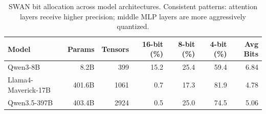 \begin{table}[t]
\centering
\caption{SWAN bit allocation across model architectures. Consistent patterns: attention layers receive higher precision; middle MLP layers are more aggressively quantized.}
\label{tab:scaling}
\begin{tabular}{lrrrrrr}
\toprule
Model & Params & Tensors & 16-bit (\%) & 8-bit (\%) & 4-bit (\%) & Avg Bits \\
\midrule
  Qwen3-8B & 8.2B & 399 & 15.2 & 25.4 & 59.4 & 6.84 \\
  Llama4-Maverick-17B & 401.6B & 1061 & 0.7 & 17.3 & 81.9 & 4.78 \\
  Qwen3.5-397B & 403.4B & 2924 & 0.5 & 25.0 & 74.5 & 5.06 \\
\bottomrule
\end{tabular}
\end{table}